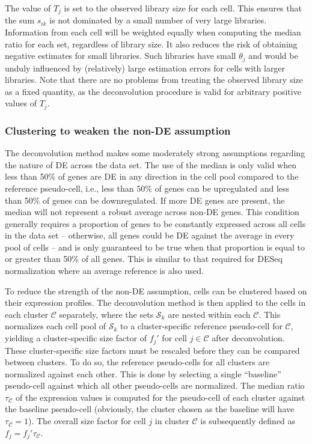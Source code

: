 \documentclass{bmcart}
\begin{document}
The value of $T_j$ is set to the observed library size for each cell.
This ensures that the sum $s_{ik}$ is not dominated by a small number of very large libraries.
Information from each cell will be weighted equally when computing the median ratio for each set, regardless of library size.
It also reduces the risk of obtaining negative estimates for small libraries.
Such libraries have small $\theta_j$ and would be unduly influenced by (relatively) large estimation errors for cells with larger libraries.
Note that there are no problems from treating the observed library size as a fixed quantity, as the deconvolution procedure is valid for arbitrary positive values of $T_j$.

\subsubsection*{Clustering to weaken the non-DE assumption}
The deconvolution method makes some moderately strong assumptions regarding the nature of DE across the data set.
The use of the median is only valid when less than 50\% of genes are DE in any direction in the cell pool compared to the reference pseudo-cell,
    i.e., less than 50\% of genes can be upregulated and less than 50\% of genes can be downregulated.
If more DE genes are present, the median will not represent a robust average across non-DE genes.
This condition generally requires a proportion of genes to be constantly expressed across all cells in the data set 
    -- otherwise, all genes could be DE against the average in every pool of cells -- 
    and is only guaranteed to be true when that proportion is equal to or greater than 50\% of all genes.
This is similar to that required for DESeq normalization where an average reference is also used.


To reduce the strength of the non-DE assumption, cells can be clustered based on their expression profiles.
The deconvolution method is then applied to the cells in each cluster $\mathcal{C}$ separately,
    where the sets $\mathcal{S}_k$ are nested within each $\mathcal{C}$.
This normalizes each cell pool of $\mathcal{S}_k$ to a cluster-specific reference pseudo-cell for $\mathcal{C}$,
    yielding a cluster-specific size factor of $f_{j}'$ for cell $j \in \mathcal{C}$ after deconvolution.
These cluster-specific size factors must be rescaled before they can be compared between clusters.
To do so, the reference pseudo-cells for all clusters are normalized against each other.
This is done by selecting a single ``baseline'' pseudo-cell against which all other pseudo-cells are normalized.
The median ratio $\tau_{\mathcal{C}}$ of the expression values is computed for the pseudo-cell of each cluster against the baseline pseudo-cell
    (obviously, the cluster chosen as the baseline will have $\tau_{\mathcal{C}}=1$).
The overall size factor for cell $j$ in cluster $\mathcal{C}$ is subsequently defined as $f_j = f_{j}'\tau_{\mathcal{C}}$.
\end{document}
